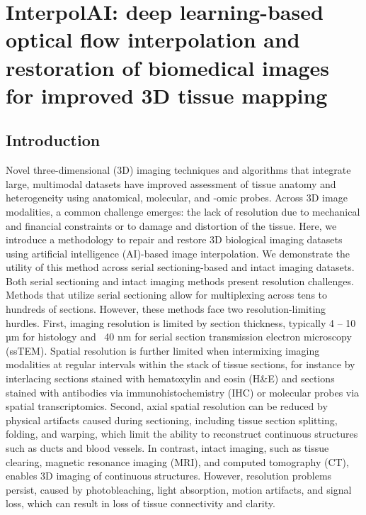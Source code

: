 \chapter{InterpolAI: deep learning-based optical flow interpolation and restoration of biomedical images for improved 3D tissue mapping} \label{chap:chap-6}
\begin{refsection}
    \section{Introduction}
    Novel three-dimensional (3D) imaging techniques and algorithms that integrate large, multimodal datasets have improved assessment of tissue anatomy and heterogeneity using anatomical, molecular, and -omic probes\cite{forjaz2023a,kiemen2022a,cline1987a,consortium2021a,yin2020a,bell-a,maitin-shepard2021a,kiemen2023a}. Across 3D image modalities, a common challenge emerges: the lack of resolution due to mechanical and financial constraints or to damage and distortion of the tissue. Here, we introduce a methodology to repair and restore 3D biological imaging datasets using artificial intelligence (AI)-based image interpolation. We demonstrate the utility of this method across serial sectioning-based and intact imaging datasets.
    Both serial sectioning and intact imaging methods present resolution challenges. Methods that utilize serial sectioning allow for multiplexing across tens to hundreds of sections\cite{kiemen2022a,lin2023a,Crawford2024Combined}. However, these methods face two resolution-limiting hurdles. First, imaging resolution is limited by section thickness, typically 4 – 10 µm for histology and ~40 nm for serial section transmission electron microscopy (ssTEM). Spatial resolution is further limited when intermixing imaging modalities at regular intervals within the stack of tissue sections, for instance by interlacing sections stained with hematoxylin and eosin (H\&E) and sections stained with antibodies via immunohistochemistry (IHC) or molecular probes via spatial transcriptomics\cite{bell-a,lin2023a,Crawford2024Combined,sans2023a,liu2020a}. Second, axial spatial resolution can be reduced by physical artifacts caused during sectioning, including tissue section splitting, folding, and warping, which limit the ability to reconstruct continuous structures such as ducts and blood vessels\cite{consortium2021a,mcinnes2005a,taqi2018a}. In contrast, intact imaging, such as tissue clearing, magnetic resonance imaging (MRI), and computed tomography (CT), enables 3D imaging of continuous structures\cite{glaser2022a,daetwyler2023a,kubota2021a}. However, resolution problems persist, caused by photobleaching, light absorption, motion artifacts, and signal loss, which can result in loss of tissue connectivity and clarity\cite{n2022a,gilmore2021a,krupa2015a}.

\end{refsection}

